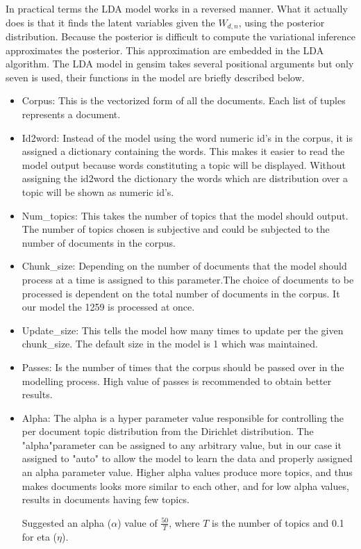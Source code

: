 In practical terms the LDA model works in a reversed manner. What it actually does is that it finds the latent variables given the $ W_{d,n} $, using the posterior distribution. Because the posterior is difficult to compute the variational inference approximates the posterior. This approximation are embedded in the LDA algorithm. The LDA model in gensim takes several positional arguments but only seven is used, their functions in the model are briefly described below.
\begin{itemize}
\item Corpus: This is the vectorized form of all the documents. Each list of tuples represents a document. 
\item Id2word: Instead of the model using the word numeric id's in the corpus, it is assigned a dictionary containing the words. This makes it easier to read the model output because words constituting a topic will be displayed. Without assigning the id2word the dictionary the words which are distribution over a topic will be shown as numeric id's. 
\item Num\_topics: This takes the number of topics that the model should output. The number of topics chosen is subjective and could be subjected to the number of documents in the corpus. 
\item Chunk\_size: Depending on the number of documents that the model  should process at a time is assigned to this parameter.The choice of documents to be processed is dependent on the total number of documents in the corpus. It our model the 1259 is processed at once.
\item Update\_size: This tells the model how many times to update per the given chunk\_size. The default size in the model is 1 which was maintained.
\item Passes: Is the number of times that the corpus should be passed over in the modelling process. High value of passes is recommended to obtain better results.
\item Alpha: The alpha is a hyper parameter value responsible for controlling the per document topic distribution from the Dirichlet distribution. The "alpha"parameter can be assigned to any arbitrary value, but in our case it assigned to "auto" to allow the model to learn the data and properly assigned an alpha parameter value. Higher alpha values produce more topics, and thus makes documents looks more similar to each other, and for low alpha values, results in  documents having few topics. 

\cite{griffiths2004finding} Suggested an alpha ($\alpha$) value of $\frac{50}{T}$, where $T$ is the number of topics and 0.1 for eta ($\eta$).
\end{itemize}


